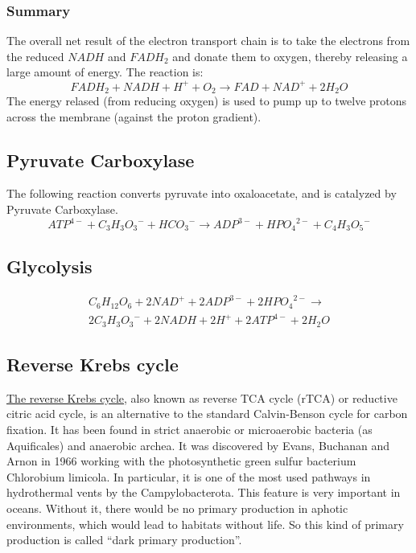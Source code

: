 \documentclass{article}
\begin{document}
\subsubsection{Summary}
The overall net result of the electron transport chain is to take the electrons from the
reduced $NADH$ and $FADH_2$ and donate them to oxygen, thereby releasing a large amount of
energy. The reaction is:
\[
    FADH_2 + NADH + H^+ + O_2 \rightarrow FAD + NAD^+ + 2H_2O
\]
The energy relased (from reducing oxygen) is used to pump up to twelve protons across the
membrane (against the proton gradient).


\subsection{Pyruvate Carboxylase}
The following reaction converts pyruvate into oxaloacetate, and is catalyzed by Pyruvate
Carboxylase.
\[
    {ATP}^{4-} + {C_3H_3O_3}^- + {HCO_3}^- \rightarrow
    {ADP}^{3-} + {HPO_4}^{2-} + {C_4H_3O_5}^-
\]

\subsection{Glycolysis}
\[
    \begin{split}
    C_6H_{12}O_6 + 2{NAD}^+ + 2{ADP}^{3-} + 2{HPO_4}^{2-} \rightarrow \\
    2{C_3H_3O_3}^- + 2NADH + 2H^+ + 2{ATP}^{4-} + 2H_2O
    \end{split}
\]

\subsection{Reverse Krebs cycle}
\href{https://en.wikipedia.org/wiki/Biological_carbon_fixation}{The reverse Krebs cycle},
also known as reverse TCA cycle (rTCA) or reductive citric acid
cycle, is an alternative to the standard Calvin-Benson cycle for carbon fixation. It has
been found in strict anaerobic or microaerobic bacteria (as Aquificales) and anaerobic
archea. It was discovered by Evans, Buchanan and Arnon in 1966 working with the
photosynthetic green sulfur bacterium Chlorobium limicola. In particular, it is one of
the most used pathways in hydrothermal vents by the Campylobacterota. This feature is
very important in oceans. Without it, there would be no primary production in aphotic
environments, which would lead to habitats without life. So this kind of primary
production is called ``dark primary production''.
\end{document}
